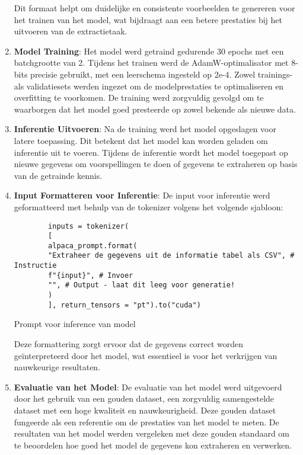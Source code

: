 \begin{enumerate}
Dit formaat helpt om duidelijke en consistente voorbeelden te genereren voor het trainen van het model, wat bijdraagt aan een betere prestaties bij het uitvoeren van de extractietaak.

\item\textbf{ Model Training}:
Het model werd getraind gedurende 30 epochs met een batchgrootte van 2. Tijdens het trainen werd de AdamW-optimalisator met 8-bits precisie gebruikt, met een leerschema ingesteld op 2e-4. Zowel trainings- als validatiesets werden ingezet om de modelprestaties te optimaliseren en overfitting te voorkomen. De training werd zorgvuldig gevolgd om te waarborgen dat het model goed presteerde op zowel bekende als nieuwe data.

\item \textbf{Inferentie Uitvoeren}:
Na de training werd het model opgeslagen voor latere toepassing. Dit betekent dat het model kan worden geladen om inferentie uit te voeren. Tijdens de inferentie wordt het model toegepast op nieuwe gegevens om voorspellingen te doen of gegevens te extraheren op basis van de getrainde kennis.


\item\textbf{ Input Formatteren voor Inferentie}:
De input voor inferentie werd geformatteerd met behulp van de tokenizer volgens het volgende sjabloon:

\begin{listing}
    \begin{verbatim}
        inputs = tokenizer(
        [
        alpaca_prompt.format(
        "Extraheer de gegevens uit de informatie tabel als CSV", # Instructie
        f"{input}", # Invoer
        "", # Output - laat dit leeg voor generatie!
        )
        ], return_tensors = "pt").to("cuda")
    \end{verbatim}
    \caption{Prompt voor inference van model}
\end{listing}

Deze formattering zorgt ervoor dat de gegevens correct worden geïnterpreteerd door het model, wat essentieel is voor het verkrijgen van nauwkeurige resultaten.

\item \textbf{Evaluatie van het Model}:
De evaluatie van het model werd uitgevoerd door het gebruik van een gouden dataset, een zorgvuldig samengestelde dataset met een hoge kwaliteit en nauwkeurigheid. Deze gouden dataset fungeerde als een referentie om de prestaties van het model te meten. De resultaten van het model werden vergeleken met deze gouden standaard om te beoordelen hoe goed het model de gegevens kon extraheren en verwerken.


\end{enumerate}
